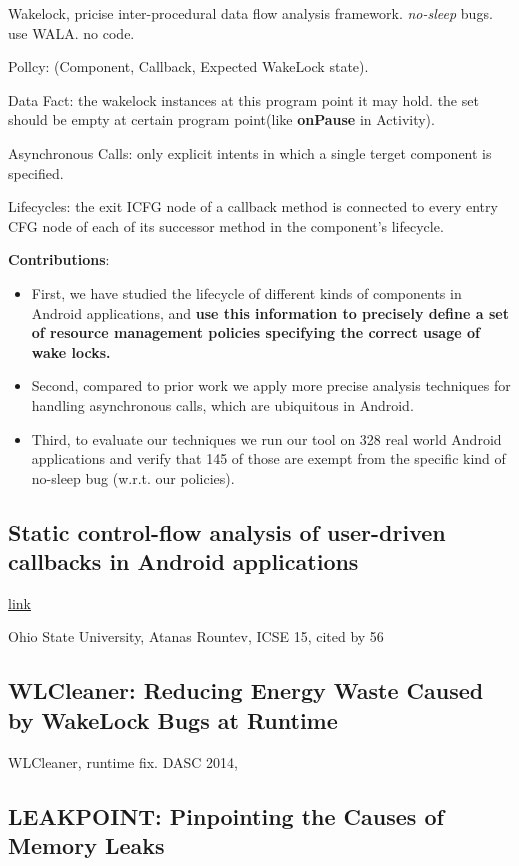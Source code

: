 Wakelock, pricise inter-procedural data flow analysis framework. \emph{no-sleep}
bugs. use WALA. no code. 

Pollcy: (Component, Callback, Expected WakeLock state). 

Data Fact: the wakelock instances at this program point it may hold. the set
should be empty at certain program point(like \textbf{onPause} in Activity).

Asynchronous Calls: only explicit intents in which a single terget component is
specified.

Lifecycles: the exit ICFG node of a callback method is connected to every entry
CFG node of each of its successor method in the component’s lifecycle.


\textbf{Contributions}:
\begin{itemize}
\item First, we have studied the lifecycle of different kinds of components in
  Android applications, and \textbf{use this information to precisely define a
    set of resource management policies specifying the correct usage of wake
    locks.}
\item Second, compared to prior work we apply more precise analysis techniques
  for handling asynchronous calls, which are ubiquitous in Android.
\item Third, to evaluate our techniques we run our tool on 328 real world
  Android applications and verify that 145 of those are exempt from the specific
  kind of no-sleep bug (w.r.t. our policies).
\end{itemize}


\subsection{Static control-flow analysis of user-driven callbacks in Android
  applications}

\href{http://dl.acm.org/citation.cfm?id=2818768}{link}

Ohio State University, Atanas Rountev, ICSE 15, cited by 56


\subsection{WLCleaner: Reducing Energy Waste Caused by WakeLock Bugs at Runtime}

WLCleaner, runtime fix. DASC 2014,


\subsection{LEAKPOINT: Pinpointing the Causes of Memory Leaks}

